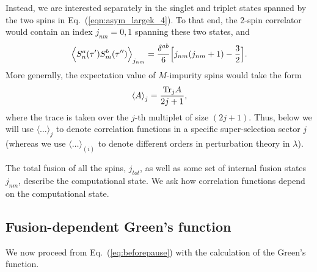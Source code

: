 \documentclass[aps,prb,twocolumn,superscriptaddress]{revtex4-1}
\newcommand{\be}{\begin{equation}}
\newcommand{\ee}{\end{equation}}
\newcommand{\Tr}[1]{\mathrm{Tr} #1}
\begin{document}
Instead, we are interested separately in the singlet and triplet states spanned by the two spins in Eq.~(\ref{eqn:asym_largek_4}). To that end, the 2-spin correlator would contain an index $j_{nm}=0,1$ spanning these two states, and
\begin{eqnarray}
\Bigl\langle{S_{n}^{a}(\tau')S_{m}^{b}(\tau'')\Bigr\rangle}_{j_{nm}}=\frac{\delta^{ab}}{6}\Bigl[j_{nm}(j_{nm}+1)-\frac{3}{2}\Bigr]. \label{eqn:asym_largek_5}
\end{eqnarray}
More generally, the expectation value of $M$-impurity spins would take the form
\be
\braket{A}_{j}=\frac{\Tr_{j}{A}}{2j+1},
\ee
where the trace is taken over the $j$-th multiplet of size $(2j+1)$. Thus, below we will use $\langle \dots \rangle_j$ to denote correlation functions in a specific super-selection sector $j$ (whereas we use $\langle \dots \rangle_{(i)}$ to denote different orders in perturbation theory in $\lambda$). 

The total fusion of all the spins, $j_{tot}$, as well as some set of internal fusion states $j_{nm}$, describe the computational state. We ask how correlation functions depend on the computational state.




\subsection{Fusion-dependent Green's function}

We now proceed from Eq.~(\ref{eq:beforepause}) with the calculation of the Green's function. 
\end{document}
